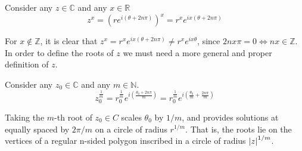 \documentclass[12pt, english]{book}
\begin{document}
	\begin{definition}
		Consider any $z \in \mathbb{C}$ and any $x \in \mathbb{R}$
		$$z^x = \left(r e^{i(\theta + 2 n \pi)} \right)^x = r^x e^{i x(\theta + 2n \pi)}$$
		\label{Exponential of z Definiion - Complex}
	\end{definition}

	For $x \nin \mathbb{Z}$, it is clear that $z^x =  r^x e^{ix(\theta + 2 n \pi)} \neq r^x e^{ix\theta}$, since $2nx\pi = 0 \iff nx \in \mathbb{Z}$. In order to define the roots of $z$ we must need a more general and proper definition of $z$.
	
	\begin{definition}
		\label{Roots of z Definition - Complex}
		Consider any $z_0 \in \mathbb{C}$ and any $m \in \mathbb{N}$.
		$$z_0^{\frac{1}{m}} = r_0^\frac{1}{m} e^{i\left(\frac{\theta_0 + 2n \pi}{m}\right)} = r_0^\frac{1}{m} e^{i \left(\frac{\theta_0}{m} + \frac{2n \pi}{m}\right)}$$
	\end{definition}  
	
	Taking the $m$-th root of $z_0 \in C$ scales $\theta_0$ by $1/m$, and provides solutions at equally spaced by $2\pi / m$ on a circle of radius $r^{1/m}$. That is, the roots lie on the vertices of a regular n-sided polygon inscribed in a circle of radius $\abs{z}^{1/m}$. 
	
\end{document}
